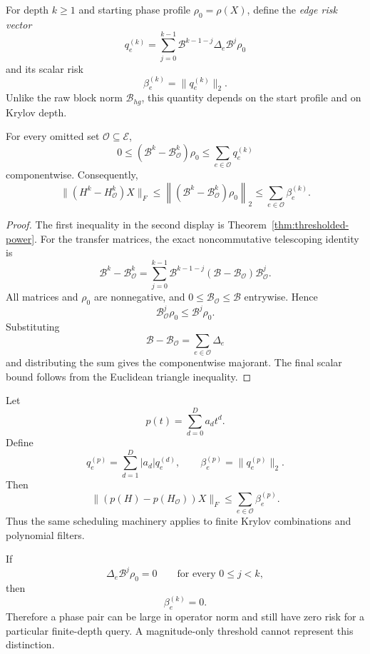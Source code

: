 For depth $k\ge1$ and starting phase profile $\rho_0=\rho(X)$, define the
\emph{edge risk vector}
\[
\boxed{
q_e^{(k)}
=
\sum_{j=0}^{k-1}
\mathcal B^{k-1-j}\Delta_e\mathcal B^j\rho_0
}
\]
and its scalar risk
\[
\boxed{
\beta_e^{(k)}=\lVert q_e^{(k)}\rVert_2.
}
\]
Unlike the raw block norm $\mathcal B_{hg}$, this quantity depends on the
start profile and on Krylov depth.

\begin{theorem}
\label{thm:edge-additive-majorant}
For every omitted set $\mathcal O\subseteq\mathcal E$,
\[
\boxed{
0\le
(\mathcal B^k-\mathcal B_{\mathcal O}^k)\rho_0
\le
\sum_{e\in\mathcal O}q_e^{(k)}
}
\]
componentwise.  Consequently,
\[
\boxed{
\lVert(H^k-H_{\mathcal O}^k)X\rVert_F
\le
\left\lVert
(\mathcal B^k-\mathcal B_{\mathcal O}^k)\rho_0
\right\rVert_2
\le
\sum_{e\in\mathcal O}\beta_e^{(k)}.
}
\]
\end{theorem}

\begin{proof}
The first inequality in the second display is
Theorem~\ref{thm:thresholded-power}.  For the transfer matrices, the exact
noncommutative telescoping identity is
\[
\mathcal B^k-\mathcal B_{\mathcal O}^k
=
\sum_{j=0}^{k-1}
\mathcal B^{k-1-j}
(\mathcal B-\mathcal B_{\mathcal O})
\mathcal B_{\mathcal O}^j.
\]
All matrices and $\rho_0$ are nonnegative, and
$0\le\mathcal B_{\mathcal O}\le\mathcal B$ entrywise.  Hence
\[
\mathcal B_{\mathcal O}^j\rho_0
\le
\mathcal B^j\rho_0.
\]
Substituting
\[
\mathcal B-\mathcal B_{\mathcal O}
=
\sum_{e\in\mathcal O}\Delta_e
\]
and distributing the sum gives the componentwise majorant.  The final scalar
bound follows from the Euclidean triangle inequality.
\end{proof}

\begin{corollary}\label{claim:final-16-2}
Let
\[
p(t)=\sum_{d=0}^{D}a_dt^d.
\]
Define
\[
q_e^{(p)}
=
\sum_{d=1}^{D}|a_d|q_e^{(d)},
\qquad
\beta_e^{(p)}=\lVert q_e^{(p)}\rVert_2.
\]
Then
\[
\boxed{
\lVert(p(H)-p(H_{\mathcal O}))X\rVert_F
\le
\sum_{e\in\mathcal O}\beta_e^{(p)}.
}
\]
Thus the same scheduling machinery applies to finite Krylov combinations and
polynomial filters.
\end{corollary}

\begin{corollary}\label{claim:final-16-3}
If
\[
\Delta_e\mathcal B^j\rho_0=0
\qquad
\text{for every }0\le j<k,
\]
then
\[
\beta_e^{(k)}=0.
\]
Therefore a phase pair can be large in operator norm and still have zero
risk for a particular finite-depth query.  A magnitude-only threshold cannot
represent this distinction.
\end{corollary}

